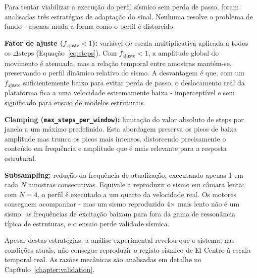 Para tentar viabilizar a execução do perfil sísmico sem perda de passo, foram analisadas três estratégias de adaptação do sinal. Nenhuma resolve o problema de fundo - apenas muda a forma como o perfil é distorcido.

\textbf{Fator de ajuste ($f_{\text{ajuste}} < 1$):} variável de escala multiplicativa aplicada a todos os $\Delta\text{steps}$ (Equação~\ref{eq:steps}). Com $f_{\text{ajuste}} < 1$, a amplitude global do movimento é atenuada, mas a relação temporal entre amostras mantém-se, preservando o perfil dinâmico relativo do sismo. A desvantagem é que, com um $f_{\text{ajuste}}$ suficientemente baixo para evitar perda de passo, o deslocamento real da plataforma fica a uma velocidade estremamente baixa - imperceptível e sem significado para ensaio de modelos estruturais.

\textbf{Clamping (\texttt{max\_steps\_per\_window}):} limitação do valor absoluto de steps por janela a um máximo predefinido. Esta abordagem preserva os picos de baixa amplitude mas trunca os picos mais intensos, distorcendo precisamente o conteúdo em frequência e amplitude que é mais relevante para a resposta estrutural.

\textbf{Subsampling:} redução da frequência de atualização, executando apenas 1 em cada $N$ amostras consecutivas. Equivale a reproduzir o sismo em câmara lenta: com $N = 4$, o perfil é executado a um quarto da velocidade real. Os motores conseguem acompanhar - mas um sismo reproduzido 4$\times$ mais lento não é um sismo: as frequências de excitação baixam para fora da gama de ressonância típica de estruturas, e o ensaio perde validade sísmica.

Apesar destas estratégias, a análise experimental revelou que o sistema, nas condições atuais, não consegue reproduzir o registo sísmico de El Centro à escala temporal real. As razões mecânicas são analisadas em detalhe no Capítulo~\ref{chapter:validation}.

